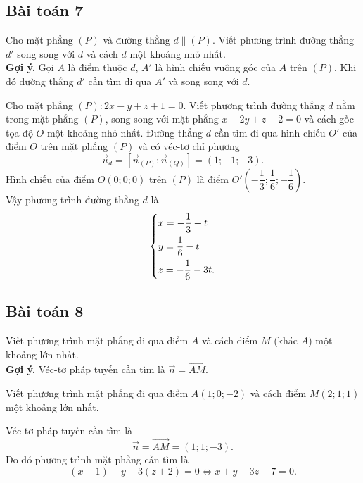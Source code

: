 \subsection{Bài toán 7}
Cho mặt phẳng $(P)$ và đường thẳng $d\parallel(P)$. Viết phương trình đường thẳng $d'$ song song với $d$ và cách $d$ một khoảng nhỏ nhất.\\
\textbf{Gợi ý.} Gọi $A$ là điểm thuộc $d$, $A'$ là hình chiếu vuông góc của $A$ trên $(P)$. Khi đó đường thẳng $d'$ cần tìm đi qua $A'$ và song song với $d$.
\begin{vd}%
Cho mặt phẳng $(P)\colon2x-y+z+1=0$. Viết phương trình đường thẳng $d$ nằm trong mặt phẳng $(P)$, song song với mặt phẳng $x-2y+z+2=0$ và cách gốc tọa độ $O$ một khoảng nhỏ nhất.
\loigiai
{
Đường thẳng $d$ cần tìm đi qua hình chiếu $O'$ của điểm $O$ trên mặt phẳng $(P)$ và có véc-tơ chỉ phương
\[\vec{u}_d=\left[\vec{n}_{(P)};\vec{n}_{(Q)}\right]=(1;-1;-3).\]
Hình chiếu của điểm $O(0;0;0)$ trên $(P)$ là điểm $O'\left(-\dfrac{1}{3};\dfrac{1}{6};-\dfrac{1}{6}\right)$.\\
Vậy phương trình đường thẳng $d$ là \[\left\{\begin{aligned}&x=-\dfrac{1}{3}+t\\&y=\dfrac{1}{6}-t\\&z=-\dfrac{1}{6}-3t.\end{aligned}\right.\]
}
\end{vd}

\subsection{Bài toán 8}
Viết phương trình mặt phẳng đi qua điểm $A$ và cách điểm $M$ (khác $A$) một khoảng lớn nhất.\\
\textbf{Gợi ý.} Véc-tơ pháp tuyến cần tìm là $\vec{n}=\vec{AM}$.  
\begin{vd}%
Viết phương trình mặt phẳng đi qua điểm $A(1;0;-2)$ và cách điểm $M(2;1;1)$ một khoảng lớn nhất. 
\loigiai
{
Véc-tơ pháp tuyến cần tìm là \[\vec{n}=\vec{AM}=(1;1;-3).\]
Do đó phương trình mặt phẳng cần tìm là
\[(x-1)+y-3(z+2)=0\Leftrightarrow x+y-3z-7=0.\]

}
\end{vd}
